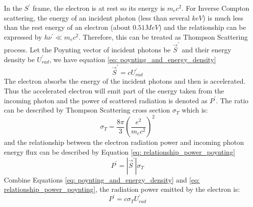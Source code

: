 \documentclass[12pt]{report}
\begin{document}
            In the $S^{\prime}$ frame, the electron is at rest so its energy is $m_e c^2$. 
            For Inverse Compton scattering, the energy of an incident photon 
            (less than several $keV$) is much less than the rest energy of an electron 
            (about $0.51MeV$) and the relationship can be expressed by 
            $h\nu^{\prime} \ll m_e c^2$. Therefore, this can be treated as Thompson 
            Scattering process. Let the Poynting vector of incident photons be 
            $\vec{S}^{\prime}$ and their energy density be $U_{rad}^{\prime}$, we have 
            equation \ref{eq: poynting_and_energy_density}
            \begin{equation}
              \label{eq: poynting_and_energy_density}
              \vec{S}^{\prime} = c U_{rad}^{\prime}
            \end{equation}
            The electron absorbs the energy of the incident photons and then is accelerated. 
            Thus the accelerated electron will emit part of the energy taken from the incoming 
            photon and the power of scattered radiation is denoted as $P^{\prime}$.
            The ratio can be described by Thompson Scattering cross section $\sigma_{T}$ 
            which is:
            \begin{equation}
              \label{eq: thompson_cross_section}
              \sigma_{T} = \frac{8\pi}{3} \left(\frac{e^2}{m_e c^2}\right)^2
            \end{equation}
            and the relationship between the electron radiation power and incoming photon 
            energy flux can be described by Equation \ref{eq: relationship_power_poynting}
            \begin{equation}
              \label{eq: relationship_power_poynting}
              P^{\prime} = \left| \vec{S}^{\prime} \right| \sigma_{T}
            \end{equation}
            Combine Equations \ref{eq: poynting_and_energy_density} and 
            \ref{eq: relationship_power_poynting}, the radiation power emitted by the 
            electron is: 
            \begin{equation}
              \label{eq: final_relationship}
              P^{\prime} = c \sigma_{T} U^{\prime}_{rad}
            \end{equation}
\end{document}
